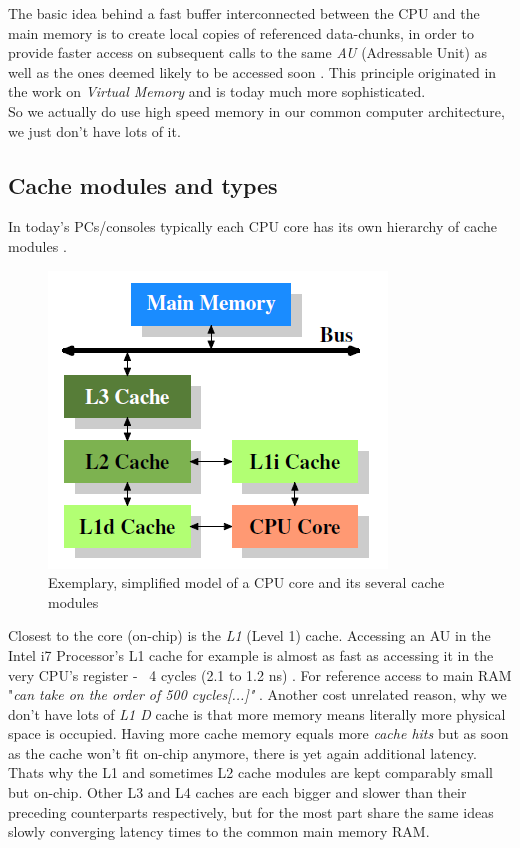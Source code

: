 The basic idea behind a fast buffer interconnected between the CPU and the main memory is to create local copies of referenced data-chunks, in order to provide faster access on subsequent calls to the same \textit{AU} (Adressable Unit) as well as the ones deemed likely to be accessed soon . This principle originated in the work on \textit{Virtual Memory}  and is today much more sophisticated.\\
So we actually do use high speed memory in our common computer architecture, we just don't have lots of it.

\subsection{Cache modules and types}
In today's PCs/consoles typically each CPU core has its own hierarchy of cache modules .
\begin{figure}[!htbp]
	\centering
	\includegraphics[width=0.4\linewidth]{PICs/cachelayout}
	\caption{Exemplary, simplified model of a CPU core and its several cache modules }\label{cache_layout}
\end{figure}
Closest to the core (on-chip) is the \textit{L1} (Level 1) cache. Accessing an AU in the  Intel i7 Processor's L1 cache for example is almost as fast as accessing it in the very CPU's register - ~4 cycles (2.1 to 1.2 ns) . For reference access to main RAM "\textit{can take on the order of 500 cycles[...]"} .
Another cost unrelated reason, why we don't have lots of \textit{L1 D} cache is that more memory means literally more physical space is occupied. Having more cache memory equals more \textit{cache hits}  but as soon as the cache won't fit on-chip anymore, there is yet again additional latency. Thats why the L1 and sometimes L2 cache modules are kept comparably small but on-chip. Other L3 and L4 caches are each bigger and slower than their preceding counterparts respectively, but for the most part share the same ideas slowly converging latency times to the common main memory RAM.\\
